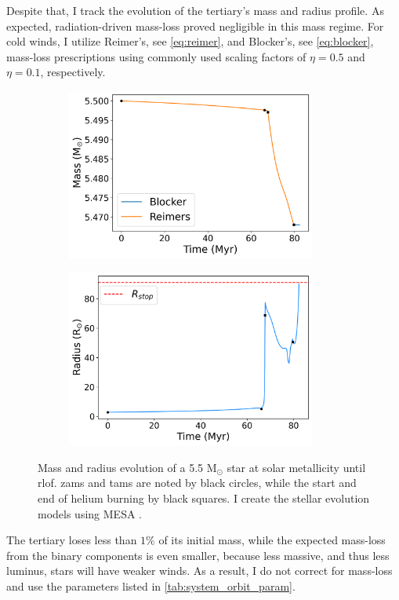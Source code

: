 Despite that, I track the evolution of the tertiary's mass and radius profile. As expected, radiation-driven mass-loss proved negligible in this mass regime. For cold winds, I utilize Reimer's, see \cref{eq:reimer}, and Blocker's, see \cref{eq:blocker}, mass-loss prescriptions using commonly used scaling factors of $\eta = 0.5$ and $\eta = 0.1$, respectively. 
\begin{figure}[H]
    \centering
    \begin{subfigure}{.5\textwidth}
    \centering
    \includegraphics[width=0.9\textwidth]{Thesis/graphs/giant_1-1mass_loss.pdf}
    \label{fig:mass_loss}
    \end{subfigure}%
    \begin{subfigure}{.5\textwidth}
    \centering
    \includegraphics[width=0.9\textwidth]{Thesis/graphs/giant_1-1radius.pdf}
    \label{fig:radius_profile}
    \end{subfigure}
    \caption{ Mass and radius evolution of a 5.5 M$_{\odot}$ star at solar metallicity until \ac{rlof}. \ac{zams} and \ac{tams} are noted by black circles, while the start and end of helium burning by black squares. I create the stellar evolution models using MESA \citep{paxton2010modules,paxton2013modules,paxton2015modules,paxton2019modules}.}
\end{figure}
The tertiary loses less than $1\%$ of its 
initial mass, while the expected mass-loss from the binary components is even smaller, because less massive, and thus less luminus, stars will have weaker winds. As a result, I do not correct for mass-loss and use the parameters listed in  \cref{tab:system_orbit_param}.  

